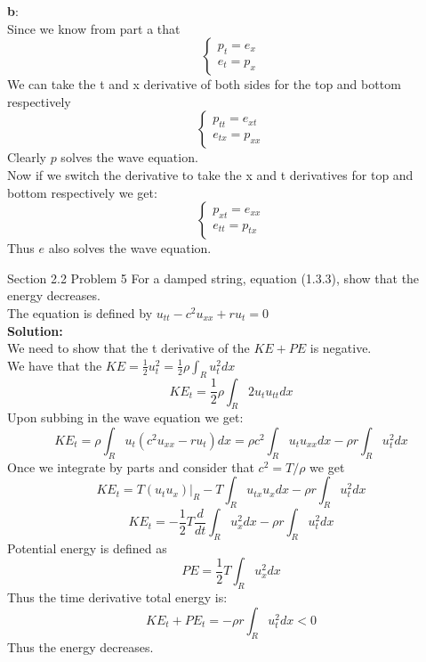 \documentclass[answers,12pt,addpoints]{exam}
\begin{document}
\begin{questions}
\textbf{b}:\\
Since we know from part a that
$$\begin{cases}
    p_t = e_x \\
    e_t = p_x
\end{cases}$$
We can take the t and x derivative of both sides for the top and bottom respectively
$$\begin{cases}
    p_{tt} = e_{xt} \\
    e_{tx} = p_{xx}
\end{cases}$$
Clearly $p$ solves the  wave equation.\\
Now if we switch the derivative to take the x and t derivatives for top and bottom respectively we get:
$$\begin{cases}
    p_{xt} = e_{xx} \\
    e_{tt} = p_{tx}
\end{cases}$$
Thus $e$ also solves the wave equation.

\question Section 2.2 Problem 5
For a damped string, equation (1.3.3), show that the energy decreases.\\
The equation is defined by $u_{tt} - c^2 u_{xx} + ru_t = 0$\\
\textbf{Solution:}\\
We need to show that the t derivative of the $KE +PE$ is negative.\\
We have that the $KE = \frac{1}{2}u_t^2 = \frac{1}{2}\rho \int_R u_t^2 dx$
$$ KE_t = \frac{1}{2}\rho \int_R 2u_t u_{tt} dx $$
Upon subbing in the wave equation we get:
$$ KE_t = \rho \int_R u_t (c^2 u_{xx} - ru_t) dx = \rho c^2 \int_R u_t u_{xx} dx - \rho r \int_R u_t^2 dx$$
Once we integrate by parts and consider that $c^2 = T/\rho$ we get 
$$ KE_t = T(u_tu_x)|_R - T\int_R u_{tx}u_x dx - \rho r \int_R u_t^2 dx$$
$$ KE_t = -\frac{1}{2}T \frac{d}{dt} \int_R u_x^2 dx - \rho r \int_R u_t^2 dx$$
Potential energy is defined as
$$ PE = \frac{1}{2} T \int_R u_x^2 dx $$
Thus the time derivative total energy is:
$$ KE_t + PE_t = -\rho r \int_R u_t^2 dx < 0$$
Thus the energy decreases.


\end{questions}
\end{document}
